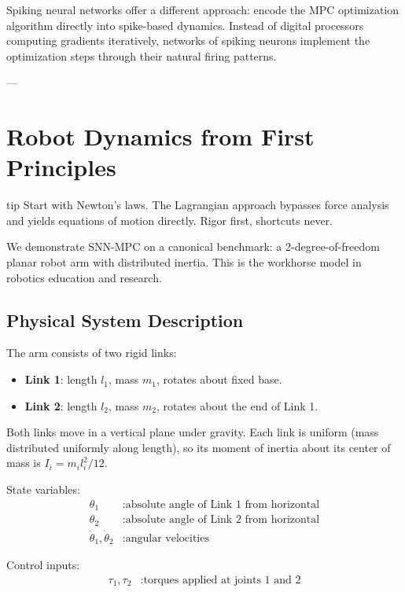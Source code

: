Spiking neural networks offer a different approach: encode the MPC optimization algorithm directly into spike-based dynamics. Instead of digital processors computing gradients iteratively, networks of spiking neurons implement the optimization steps through their natural firing patterns.

---

\section{Robot Dynamics from First Principles}
\begin{block}{tip}
Start with Newton's laws. The Lagrangian approach bypasses force analysis and yields equations of motion directly. Rigor first, shortcuts never.
\end{block}

\label{sec:robot-dynamics}

We demonstrate SNN-MPC on a canonical benchmark: a 2-degree-of-freedom planar robot arm with distributed inertia. This is the workhorse model in robotics education and research.

\subsection{Physical System Description}

The arm consists of two rigid links:

\begin{itemize}
\item \textbf{Link 1}: length $l_1$, mass $m_1$, rotates about fixed base.
\item \textbf{Link 2}: length $l_2$, mass $m_2$, rotates about the end of Link 1.
\end{itemize}

Both links move in a vertical plane under gravity. Each link is uniform (mass distributed uniformly along length), so its moment of inertia about its center of mass is $I_i = m_i l_i^2 / 12$.

State variables:
\begin{align}
\theta_1 &: \text{absolute angle of Link 1 from horizontal} \\
\theta_2 &: \text{absolute angle of Link 2 from horizontal} \\
\dot{\theta}_1, \dot{\theta}_2 &: \text{angular velocities}
\end{align}

Control inputs:
\begin{align}
\tau_1, \tau_2 &: \text{torques applied at joints 1 and 2}
\end{align}

